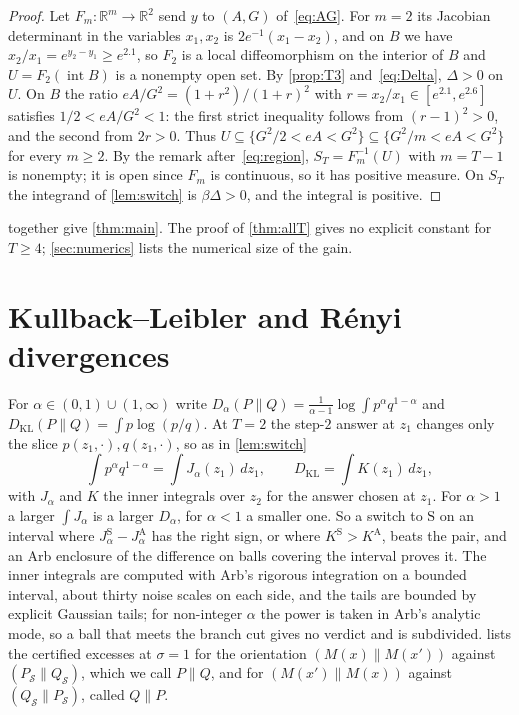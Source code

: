 \documentclass[11pt]{amsart}
\theoremstyle{definition}
\theoremstyle{remark}
\newcommand{\R}{\mathbb R}
\newcommand{\ANTI}{\mathrm{A}}
\newcommand{\SAME}{\mathrm{S}}
\begin{document}
\begin{proof}
Let $F_m\colon\R^m\to\R^2$ send $y$ to $(A,G)$ of~\eqref{eq:AG}. For $m=2$ its Jacobian determinant in the variables $x_1,x_2$ is $2e^{-1}(x_1-x_2)$, and on $B$ we have $x_2/x_1=e^{y_2-y_1}\ge e^{2.1}$, so $F_2$ is a local diffeomorphism on the interior of $B$ and $U=F_2(\operatorname{int}B)$ is a nonempty open set. By \cref{prop:T3} and~\eqref{eq:Delta}, $\Delta>0$ on $U$. On $B$ the ratio $eA/G^2=(1+r^2)/(1+r)^2$ with $r=x_2/x_1\in[e^{2.1},e^{2.6}]$ satisfies $1/2<eA/G^2<1$: the first strict inequality follows from $(r-1)^2>0$, and the second from $2r>0$. Thus $U\subseteq\{G^2/2<eA<G^2\}\subseteq\{G^2/m<eA<G^2\}$ for every $m\ge2$. By the remark after~\eqref{eq:region}, $S_T=F_m^{-1}(U)$ with $m=T-1$ is nonempty; it is open since $F_m$ is continuous, so it has positive measure. On $S_T$ the integrand of \cref{lem:switch} is $\beta\Delta>0$, and the integral is positive.
\end{proof}

 together give \cref{thm:main}. The proof of \cref{thm:allT} gives no explicit constant for $T\ge4$; \cref{sec:numerics} lists the numerical size of the gain.

\section{Kullback--Leibler and R\'enyi divergences}\label{sec:renyi}

For $\alpha\in(0,1)\cup(1,\infty)$ write $D_\alpha(P\|Q)=\frac1{\alpha-1}\log\int p^\alpha q^{1-\alpha}$ and $D_{\mathrm{KL}}(P\|Q)=\int p\log(p/q)$. At $T=2$ the step-$2$ answer at $z_1$ changes only the slice $p(z_1,\cdot),q(z_1,\cdot)$, so as in \cref{lem:switch}
\[
\int p^\alpha q^{1-\alpha}=\int J_\alpha(z_1)\,dz_1,\qquad D_{\mathrm{KL}}=\int K(z_1)\,dz_1,
\]
with $J_\alpha$ and $K$ the inner integrals over $z_2$ for the answer chosen at $z_1$. For $\alpha>1$ a larger $\int J_\alpha$ is a larger $D_\alpha$, for $\alpha<1$ a smaller one. So a switch to $\SAME$ on an interval where $J_\alpha^{\SAME}-J_\alpha^{\ANTI}$ has the right sign, or where $K^{\SAME}>K^{\ANTI}$, beats the pair, and an Arb enclosure of the difference on balls covering the interval proves it. The inner integrals are computed with Arb's rigorous integration on a bounded interval, about thirty noise scales on each side, and the tails are bounded by explicit Gaussian tails; for non-integer $\alpha$ the power is taken in Arb's analytic mode, so a ball that meets the branch cut gives no verdict and is subdivided.  lists the certified excesses at $\sigma=1$ for the orientation $(M(x)\|M(x'))$ against $(P_{\mathcal S}\|Q_{\mathcal S})$, which we call $P\|Q$, and for $(M(x')\|M(x))$ against $(Q_{\mathcal S}\|P_{\mathcal S})$, called $Q\|P$.
\end{document}
